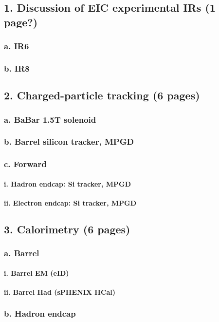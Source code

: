 \documentclass{report}
\begin{document}
\subsection{1. Discussion of EIC experimental IRs (1 page?)}
\subsubsection{a. IR6}
\subsubsection{b. IR8}
\subsection{2. Charged-particle tracking (6 pages)}
\subsubsection{a. BaBar 1.5T solenoid}
\subsubsection{b. Barrel silicon tracker, MPGD}
\subsubsection{c. Forward}
\paragraph{i. Hadron endcap: Si tracker, MPGD}
\paragraph{ii. Electron endcap: Si tracker, MPGD}
\subsection{3. Calorimetry (6 pages)}
\subsubsection{a. Barrel}
\paragraph{i. Barrel EM (eID)}
\paragraph{ii. Barrel Had (sPHENIX HCal)}
\subsubsection{b. Hadron endcap}
\end{document}
